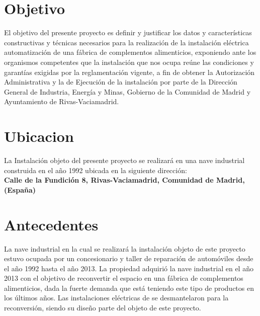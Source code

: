 \section{Objetivo}
El objetivo del presente proyecto es definir y justificar los datos y características constructivas y técnicas necesarios para la realización de la instalación eléctrica automatización de una fábrica de complementos alimenticios, exponiendo ante los organismos competentes que la instalación que nos ocupa reúne las condiciones y garantías exigidas por la reglamentación vigente, a fin de obtener la Autorización Administrativa y la de Ejecución de la instalación por parte de la Dirección General de Industria, Energía y Minas, Gobierno de la Comunidad de Madrid y Ayuntamiento de Rivas-Vaciamadrid.\
 
\section{Ubicacion}

La Instalación objeto del presente proyecto se realizará en una nave industrial construida en el año 1992 ubicada en la siguiente dirección:\\

 {\bfseries Calle de la Fundición 8, Rivas-Vaciamadrid, Comunidad de Madrid, (España)}

\section{Antecedentes}

La nave industrial en la cual se realizará la instalación objeto de este proyecto estuvo ocupada por un concesionario y taller de reparación de automóviles desde el año 1992 hasta el año 2013. La propiedad adquirió la nave industrial en el año 2013 con el objetivo de reconvertir el espacio en una fábrica de complementos alimenticios, dada la fuerte demanda que está teniendo este tipo de productos en los últimos años. Las instalaciones eléctricas de se desmantelaron para la reconversión, siendo su diseño parte del objeto de este proyecto.\

